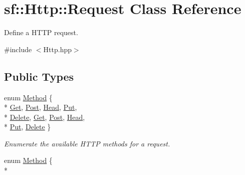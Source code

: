 \hypertarget{classsf_1_1_http_1_1_request}{\section{sf\-:\-:Http\-:\-:Request Class Reference}
\label{classsf_1_1_http_1_1_request}
}


Define a H\-T\-T\-P request.  




{\ttfamily \#include $<$Http.\-hpp$>$}

\subsection*{Public Types}
\begin{DoxyCompactItemize}
\item 
enum \hyperlink{classsf_1_1_http_1_1_request_a620f8bff6f43e1378f321bf53fbf5598}{Method} \{ \\*
\hyperlink{classsf_1_1_http_1_1_request_a620f8bff6f43e1378f321bf53fbf5598a24d06852a988a57bbc05874f675ea34b}{Get}, 
\hyperlink{classsf_1_1_http_1_1_request_a620f8bff6f43e1378f321bf53fbf5598a092cffa0afe3e0295202bd6c4b9f8b7b}{Post}, 
\hyperlink{classsf_1_1_http_1_1_request_a620f8bff6f43e1378f321bf53fbf5598a3ac3951b775bb3a13c223b3d9405e6d9}{Head}, 
\hyperlink{classsf_1_1_http_1_1_request_a620f8bff6f43e1378f321bf53fbf5598ab22a362fb057e9cee2d2b23c4ff710fd}{Put}, 
\\*
\hyperlink{classsf_1_1_http_1_1_request_a620f8bff6f43e1378f321bf53fbf5598afc3cd1d5383bd18cd82a21e293c094ab}{Delete}, 
\hyperlink{classsf_1_1_http_1_1_request_a620f8bff6f43e1378f321bf53fbf5598a24d06852a988a57bbc05874f675ea34b}{Get}, 
\hyperlink{classsf_1_1_http_1_1_request_a620f8bff6f43e1378f321bf53fbf5598a092cffa0afe3e0295202bd6c4b9f8b7b}{Post}, 
\hyperlink{classsf_1_1_http_1_1_request_a620f8bff6f43e1378f321bf53fbf5598a3ac3951b775bb3a13c223b3d9405e6d9}{Head}, 
\\*
\hyperlink{classsf_1_1_http_1_1_request_a620f8bff6f43e1378f321bf53fbf5598ab22a362fb057e9cee2d2b23c4ff710fd}{Put}, 
\hyperlink{classsf_1_1_http_1_1_request_a620f8bff6f43e1378f321bf53fbf5598afc3cd1d5383bd18cd82a21e293c094ab}{Delete}
 \}
\begin{DoxyCompactList}\small\item\em Enumerate the available H\-T\-T\-P methods for a request. \end{DoxyCompactList}\item 
enum \hyperlink{classsf_1_1_http_1_1_request_a620f8bff6f43e1378f321bf53fbf5598}{Method} \{ \\*

\end{DoxyCompactItemize}

